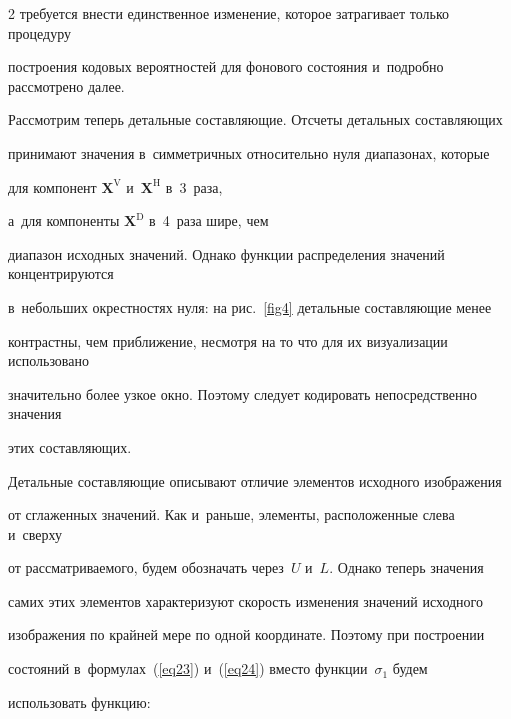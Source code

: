 \begin{multicols}{2}
требуется внести единственное изменение, которое затрагивает только процедуру 

по\-стро\-ения кодовых вероятностей для фонового со\-сто\-яния и~подробно рассмотрено далее.

{ %



}



Рассмотрим теперь детальные составляющие. Отсчеты детальных составляющих 

принимают значения в~симметричных относительно нуля диапазонах, которые 

для компонент  $\mathbf{X}^{\mathrm{V}}$ и~$\mathbf{X}^{\mathrm{H}}$ в~3~раза, 

а~для компоненты $\mathbf{X}^{\mathrm{D}}$ в~4~раза шире, чем 

диапазон исходных значений. Однако функции распределения значений концентрируются 

в~небольших окрестностях нуля: на рис.~\ref{fig4} детальные составляющие менее 

контрастны, чем приближение, несмотря на то что для их визуализации использовано 

значительно более узкое окно. Поэтому следует кодировать непосредственно значения 

этих составляющих.



Детальные составляющие описывают отличие элементов исходного изображения 

от сглаженных значений. Как и~раньше, элементы, расположенные слева и~сверху 

от рассматриваемого, будем обозначать через~$U$ и~$L$. Однако теперь значения 

самих этих элементов характеризуют скорость изменения значений исходного 

изображения по крайней мере по одной координате. Поэтому при построении 

состояний в~формулах~(\ref{eq23}) и~(\ref{eq24}) вместо функции~$\sigma_1$ будем 

использовать функцию:



\vspace*{3pt}



\noindent

\begin{equation}

\label{eq37}


\end{equation}
\end{multicols}
